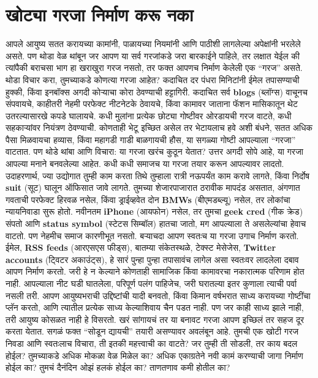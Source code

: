  \chapter{खोट्या गरजा निर्माण करू नका}
आपले आयुष्य सतत करायच्या कामांनी, पाळायच्या नियमांनी आणि पाठीशी लागलेल्या अपेक्षांनी भरलेले असते. पण थोडा वेळ थांबून जर आपण या सर्व गरजांकडे जरा बारकाईने पाहिले, तर लक्षात येईल की त्यांपैकी बराचसा भाग हा खराखुरा गरज नसतो, तर फक्त आपणच निर्माण केलेली एक ``गरज'' असते.
थोडा विचार करा,  तुमच्याकडे कोणत्या गरजा आहेत? कदाचित दर पंधरा मिनिटांनी ईमेल तपासण्याची हुक्की, किंवा इनबॉक्स अगदी कोऱ्याचा कोरा ठेवण्याची हट्टागिरी. कदाचित सर्व \textbf {blogs} (ब्लॉग्स) वाचूनच संपवायचे, काहीतरी नेहमी परफेक्ट नीटनेटके ठेवायचे, किंवा कामावर जाताना फॅशन मासिकातून थेट उतरल्यासारखे कपडे घालायचे.
 कधी मुलांना प्रत्येक छोट्या गोष्टीवर ओरडायची गरज वाटते, कधी सहकाऱ्यांवर नियंत्रण ठेवण्याची. कोणताही भेटू इच्छित असेल तर भेटायलाच हवे अशी बंधने, सतत अधिक पैसा मिळवायचा हव्यास, किंवा महागडी गाडी बाळगायची हौस,  या सगळ्या गोष्टी आपल्याला ``गरजा'' वाटतात.
पण थोडे थांबा आणि विचारा: या गरजा खरंच कुठून येतात? उत्तर अगदी सोपे आहे,  या गरजा आपल्या मनाने बनवलेल्या आहेत.
कधी कधी समाजच या गरजा तयार करून आपल्यावर लादतो. उदाहरणार्थ, ज्या उद्योगात तुम्ही काम करता तिथे तुम्हाला रात्री नऊपर्यंत काम करावे लागते, किंवा निर्दोष \textbf {suit} (सूट) घालून ऑफिसात जावे लागते. तुमच्या शेजारपाजारात ठरावीक मापदंड असतात,  अंगणात गवताची परफेक्ट हिरवळ नसेल, किंवा ड्राईव्हवेत दोन \textbf {BMWs} (बीएमडब्ल्यू) नसेल, तर लोकांचा न्यायनिवाडा सुरू होतो. नवीनतम \textbf {iPhone} (आयफोन) नसेल, तर तुमचा \textbf {geek cred} (गीक क्रेड) संपतो आणि \textbf {status symbol} (स्टेटस सिम्बॉल) हातचा जातो,  मग आपल्याला ते असलेल्यांचा हेवाच वाटतो.
पण नेहमीच समाज कारणीभूत नसतो. बऱ्याचदा आपण स्वतःच या गरजा उगाच निर्माण करतो. ईमेल, \textbf {RSS feeds} (आरएसएस फीड्स), बातम्या संकेतस्थळे, टेक्स्ट मेसेजेस, \textbf {Twitter accounts} (ट्विटर अकाउंट्स),  हे सारं पुन्हा पुन्हा तपासावंच लागेल असा स्वतःवर लादलेला दबाव आपण निर्माण करतो. जरी हे न केल्याने कोणताही सामाजिक किंवा कामावरचा नकारात्मक परिणाम होत नाही.
 आपल्याला नीट घडी घातलेला, परिपूर्ण पलंग पाहिजेच, जरी घरातल्या इतर कुणाला त्याची पर्वा नसली तरी. आपण आयुष्यभराची उद्दिष्टांची यादी बनवतो, किंवा किमान वर्षभरात साध्य करायच्या गोष्टींचा प्लॅन करतो,  आणि त्यातील प्रत्येक साध्य केल्याशिवाय चैन पडत नाही. पण जर काही साध्य झाले नाही, तरी आयुष्य कोसळत नाही हे विसरतो.
खरं सांगायचं तर या बनावट गरजा आपण इच्छिलं तर सहज दूर करता येतात. सगळं फक्त ``सोडून द्यायची'' तयारी असण्यावर अवलंबून आहे.
तुमची एक खोटी गरज निवडा आणि स्वतःलाच विचारा,  ती इतकी महत्त्वाची का वाटते? जर तुम्ही ती सोडली, तर काय बदल होईल? तुमच्याकडे अधिक मोकळा वेळ मिळेल का? अधिक एकाग्रतेने नवी कामं करण्याची जागा निर्माण होईल का? तुमचं दैनंदिन ओझं हलकं होईल का? ताणतणाव कमी होतील का?
